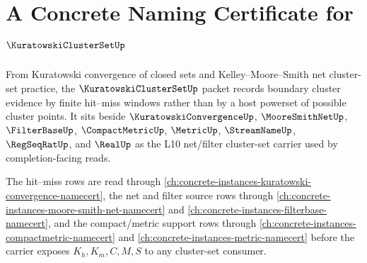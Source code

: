 \chapter{A Concrete Naming Certificate for $\KuratowskiClusterSetUp$}
\label{ch:concrete-instances-kuratowski-cluster-set-namecert}

From Kuratowski convergence of closed sets and Kelley--Moore--Smith net cluster-set practice, the $\KuratowskiClusterSetUp$ packet records boundary cluster evidence by finite hit--miss windows rather than by a host powerset of possible cluster points. It sits beside $\KuratowskiConvergenceUp$, $\MooreSmithNetUp$, $\FilterBaseUp$, $\CompactMetricUp$, $\MetricUp$, $\StreamNameUp$, $\RegSeqRatUp$, and $\RealUp$ as the L10 net/filter cluster-set carrier used by completion-facing reads.

The hit--miss rows are read through \autoref{ch:concrete-instances-kuratowski-convergence-namecert}, the net and filter source rows through \autoref{ch:concrete-instances-moore-smith-net-namecert} and \autoref{ch:concrete-instances-filterbase-namecert}, and the compact/metric support rows through \autoref{ch:concrete-instances-compactmetric-namecert} and \autoref{ch:concrete-instances-metric-namecert} before the carrier exposes $K_h,K_m,C,M,S$ to any cluster-set consumer.

